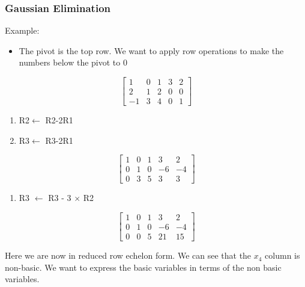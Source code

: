 \documentclass[11pt]{book}
\begin{document}
{\subsubsection{Gaussian Elimination}
\par{Example: }
\begin{itemize}
	\item{The pivot is the top row. We want to apply row operations to make the numbers below the pivot to 0}
\end{itemize}
\[
\left[
\begin{array}{cccc|c}
1 & 0 & 1 & 3 & 2 \\
2 & 1 & 2 & 0 & 0 \\
-1 & 3 & 4 & 0 & 1
\end{array}
\right]
\]
\begin{enumerate}
	\item{R2$\leftarrow$ R2-2R1}
	\item{R3$\leftarrow$ R3-2R1}
\end{enumerate}
\[
\left[
\begin{array}{cccc|c}
1 & 0 & 1 & 3 & 2 \\
0 & 1 & 0 & -6 & -4 \\
0 & 3 & 5 & 3 & 3
\end{array}
\right]
\]
\begin{enumerate}
	\item{R3 $\leftarrow$ R3 - 3 $\times$ R2}
\end{enumerate}
\[
\left[
\begin{array}{cccc|c}
1 & 0 & 1 & 3 & 2 \\
0 & 1 & 0 & -6 & -4 \\
0 & 0 & 5 & 21 & 15
\end{array}
\right]
\]
\par{Here we are now in reduced row echelon form. We can see that the $x_{4}$ column is non-basic. We want to express the basic variables in terms of the non basic variables.}
}
\end{document}

